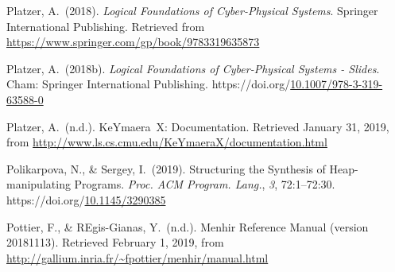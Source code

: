 \documentclass[12pt,twoside]{article}
\begin{document}
{\begin{thebibliography}{222}
Platzer, A.~(2018). \emph{Logical Foundations of Cyber-Physical Systems}. Springer International Publishing. Retrieved from \href{https://www.springer.com/gp/book/9783319635873}{{\ttfamily https://\hspace{0pt}www.\hspace{0pt}springer.\hspace{0pt}com/\hspace{0pt}gp/\hspace{0pt}book/\hspace{0pt}9783319635873}}\label{platzer_logical_2018}%

Platzer, A.~(2018b). \emph{Logical Foundations of Cyber-Physical Systems - Slides}. Cham: Springer International Publishing. https://doi.org/\href{https://dx.doi.org/10.1007/978-3-319-63588-0}{10.1007/978-3-319-63588-0}\label{platzer_logical_2018-1}%

Platzer, A.~(n.d.). KeYmaera X: Documentation. Retrieved January 31, 2019, from \href{http://www.ls.cs.cmu.edu/KeYmaeraX/documentation.html}{{\ttfamily http://\hspace{0pt}www.\hspace{0pt}ls.\hspace{0pt}cs.\hspace{0pt}cmu.\hspace{0pt}edu/\hspace{0pt}KeYmaeraX/\hspace{0pt}documentation.\hspace{0pt}html}}\label{platzer_keymaera_nodate}%

Polikarpova, N., \& Sergey, I.~(2019). Structuring the Synthesis of Heap-manipulating Programs. \emph{Proc. ACM Program. Lang.}, \emph{3}, 72:1–72:30. https://doi.org/\href{https://dx.doi.org/10.1145/3290385}{10.1145/3290385}\label{polikarpova_structuring_2019}%

Pottier, F., \& REgis-Gianas, Y.~(n.d.). Menhir Reference Manual (version 20181113). Retrieved February 1, 2019, from \href{http://gallium.inria.fr/~fpottier/menhir/manual.html}{{\ttfamily http://\hspace{0pt}gallium.\hspace{0pt}inria.\hspace{0pt}fr/\hspace{0pt}\textasciitilde{}fpottier/\hspace{0pt}menhir/\hspace{0pt}manual.\hspace{0pt}html}}\label{pottier_menhir_nodate}%


\end{thebibliography}}
\end{document}
